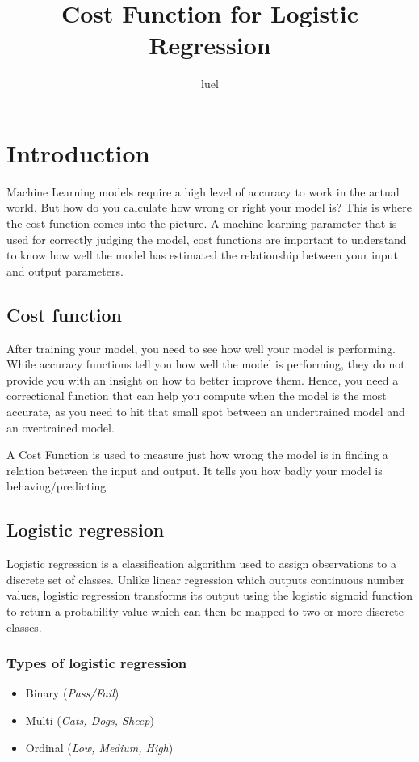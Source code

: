 \documentclass[10pt,a4paper]{article}
\title{Cost Function for Logistic Regression}
\author{luel}
\date{}
\begin{document}
\maketitle \qquad \qquad \qquad \qquad \quad  \qquad
\newpage
\tableofcontents
\newpage
\section{Introduction} 
Machine Learning models require a high level of accuracy to work in the actual world. But how do you calculate how wrong or right your model is? This is where the cost function comes into the picture. A machine learning parameter that is used for correctly judging the model, cost functions are important to understand to know how well the model has estimated the relationship between your input and output parameters.

\subsection{Cost function}
After training your model, you need to see how well your model is performing. While accuracy functions tell you how well the model is performing, they do not provide you with an insight on how to better improve them. Hence, you need a correctional function that can help you compute when the model is the most accurate, as you need to hit that small spot between an undertrained model and an overtrained model. 

A Cost Function is used to measure just how wrong the model is in finding a relation between the input and output. It tells you how badly your model is behaving/predicting

\subsection{Logistic regression}
Logistic regression is a classification algorithm used to assign observations to a discrete set of classes. Unlike linear regression which outputs continuous number values, logistic regression transforms its output using the logistic sigmoid function to return a probability value which can then be mapped to two or more discrete classes.

\subsubsection{Types of logistic regression}
\begin{itemize}
\item  Binary (\textit{Pass/Fail})
\item  Multi (\textit{Cats, Dogs, Sheep})
\item  Ordinal (\textit{Low, Medium, High})
\end{itemize}
\end{document}
